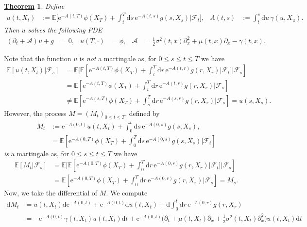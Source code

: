 \documentclass[12pt]{book}
\let\varphi\phi
\numberwithin{equation}{chapter}
\theoremstyle{plain}
\newtheorem{theorem}{\underline{Theorem}}
\numberwithin{theorem}{section}
\theoremstyle{definition}
\numberwithin{exercise}{chapter}
\let\oldendproof\endproof
\renewenvironment{proof}[1][\proofname]{%
  \oldproof[\scshape\underline{#1}]%
}{\oldendproof}
\newcommand{\<}{\langle}
\renewcommand{\>}{\rangle}
\renewcommand{\(}{\left(}
\renewcommand{\)}{\right)}
\renewcommand{\[}{\left[}
\renewcommand{\]}{\right]}
\newcommand\Eb{\mathds{E}}
\newcommand\Ac{\mathscr{A}}
\newcommand\Fc{\mathscr{F}}
\newcommand\sig{\sigma}
\newcommand\gam{\gamma}
\renewcommand\d{\partial}
\newcommand\dd{\mathrm{d}}
\newcommand\ee{\mathrm{e}}
\begin{document}
\begin{theorem}
Define
\begin{align}
u(t,X_t)
	&:=	\Eb \Big[ \ee^{-A(t,T)} \varphi(X_T) + \int_t^T \dd s \, \ee^{-A(t,s)} g(s,X_s) \Big| \Fc_t \Big] , &
A(t,s)
	&:=	\int_t^s \dd u \, \gam(u,X_u) .
\end{align}
Then $u$ solves the following PDE
\begin{align}
(\d_t + \Ac ) u + g
	&=	0 , &
u(T,\cdot)
	&=	\varphi , &
\Ac
	&=	\tfrac{1}{2} \sig^2(t,x) \d_x^2 + \mu(t,x) \d_x - \gam(t,x) . \label{eq:u.pde.2}
\end{align}
\end{theorem}

\begin{proof}
Note that the function $u$ is \emph{not} a martingale as, for $0 \leq s \leq t \leq T$ we have
\begin{align}
\Eb[ u(t,X_t) | \Fc_s]
	&=	\Eb[ \Eb[ \ee^{-A(t,T)} \varphi(X_T) + \int_t^T \dd r \, \ee^{-A(t,r)} g(r,X_r) | \Fc_t ] | \Fc_s ] \\
	&=	\Eb[ \ee^{-A(t,T)} \varphi(X_T) + \int_t^T \dd r \, \ee^{-A(t,r)} g(r,X_r) | \Fc_s ] \\
	&\neq  \Eb[ \ee^{-A(s,T)} \varphi(X_T) + \int_s^T \dd r \, \ee^{-A(s,r)} g(r,X_r) | \Fc_s ]
	=		u(s,X_s) .
\end{align}
However, the  process $M=(M_t)_{0 \leq t \leq T}$, defined by
\begin{align}
M_t
	&:=	\ee^{-A(0,t)} u(t,X_t) + \int_0^t \dd s \, \ee^{-A(0,s)} g(s,X_s) , \\
	&=	\Eb[ \ee^{-A(0,T)} \varphi(X_T) + \int_0^T \dd s \, \ee^{-A(0,s)} g(s,X_s) | \Fc_t ]
\end{align}
\emph{is} a martingale as, for $0 \leq s \leq t \leq T$ we have
\begin{align}
\Eb[ M_t | \Fc_s]
	&=	\Eb[ \Eb[ \ee^{-A(0,T)} \varphi(X_T) + \int_0^T \dd r \, \ee^{-A(0,r)} g(r,X_r) | \Fc_t ] | \Fc_s ] \\
	&=	\Eb[ \ee^{-A(0,T)} \varphi(X_T) + \int_0^T \dd r \, \ee^{-A(0,r)} g(r,X_r) | \Fc_s ] 
	=	M_s .
\end{align}
Now, we take the differential of $M$.  We compute
\begin{align}
\dd M_t
	&=	u(t,X_t) \dd \ee^{-A(0,t)} +  \ee^{-A(0,t)} \dd u(t,X_t) + \dd \int_0^t \dd r \, \ee^{-A(0,r)} g(r,X_r) \\
	&=	- \ee^{-A(0,t)} \gam(t,X_t) u(t,X_t) \dd t 
			+	\ee^{-A(0,t)} \Big( \d_t + \mu(t,X_t) \d_x + \tfrac{1}{2}\sig^2(t,X_t) \d_x^2 \Big) u(t,X_t) \dd t \\ &\quad

\end{align}
\end{proof}
\end{document}
